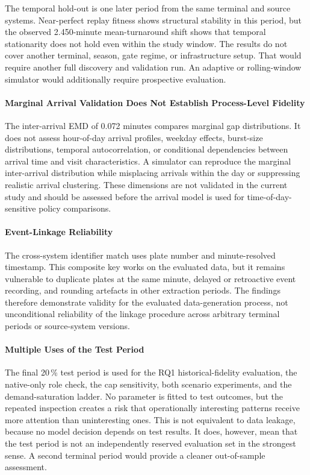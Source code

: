 The temporal hold-out is one later period from the same terminal and source
systems. Near-perfect replay fitness shows structural stability in this
period, but the observed 2.450-minute mean-turnaround shift shows that temporal
stationarity does not hold even within the study window. The results do not
cover another terminal, season, gate regime, or infrastructure setup. That
would require another full discovery and validation run. An adaptive or
rolling-window simulator would additionally require prospective evaluation.

\paragraph{Marginal Arrival Validation Does Not Establish Process-Level
Fidelity}

The inter-arrival EMD of 0.072 minutes compares marginal gap distributions.
It does not assess hour-of-day arrival profiles, weekday effects, burst-size
distributions, temporal autocorrelation, or conditional dependencies between
arrival time and visit characteristics.  A simulator can reproduce the
marginal inter-arrival distribution while misplacing arrivals within the day
or suppressing realistic arrival clustering.  These dimensions are not
validated in the current study and should be assessed before the arrival model
is used for time-of-day-sensitive policy comparisons.

\paragraph{Event-Linkage Reliability}

The cross-system identifier match uses plate number and minute-resolved
timestamp.  This composite key works on the evaluated data, but it remains
vulnerable to duplicate plates at the same minute, delayed or retroactive
event recording, and rounding artefacts in other extraction periods.  The
findings therefore demonstrate validity for the evaluated data-generation
process, not unconditional reliability of the linkage procedure across
arbitrary terminal periods or source-system versions.

\paragraph{Multiple Uses of the Test Period}

The final 20\,\% test period is used for the RQ1 historical-fidelity
evaluation, the native-only role check, the cap sensitivity, both scenario
experiments, and the demand-saturation ladder.  No parameter is fitted to test
outcomes, but the repeated inspection creates a risk that operationally
interesting patterns receive more attention than uninteresting ones.  This is
not equivalent to data leakage, because no model decision depends on test
results.  It does, however, mean that the test period is not an independently
reserved evaluation set in the strongest sense.  A second terminal period
would provide a cleaner out-of-sample assessment.

